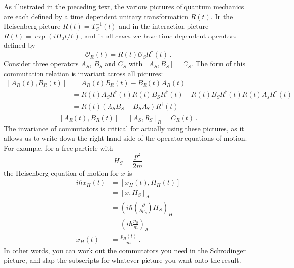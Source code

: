 
As illustrated in the preceding text, the various pictures of quantum mechanics are each defined by a time dependent unitary transformation $R(t)$.
In the Heisenberg picture $R(t) = T_S^{-1}(t)$ and in the interaction picture $R(t) = \exp(i H_0 t/ \hbar)$, and in all cases we have time dependent operators defined by
\begin{equation*}
  \mathcal{O}_R(t) = R(t) \mathcal{O}_S R^\dagger(t)
  \, .
\end{equation*}
Consider three operators $A_S$, $B_S$ and $C_S$ with $[A_S, B_S] = C_S$.
The form of this commutation relation is invariant across all pictures:
\begin{align*}
  \left[ A_R(t), B_R(t) \right]
  &= A_R(t) B_R(t) - B_R(t) A_R(t) \\
  &= R(t) A_S R^\dagger(t) R(t) B_S R^\dagger(t) - R(t) B_S R^\dagger(t) R(t) A_s R^\dagger(t) \\
  &= R(t) \left( A_S B_S - B_S A_S \right) R^\dagger(t) \\
\end{align*}
\begin{equation}
  \boxed{
  \left[ A_R(t), B_R(t) \right] = \left[ A_S, B_S \right]_R = C_R(t)
  }
  \, .
\end{equation}
The invariance of commutators is critical for actually using these pictures, as it allows us to write down the right hand side of the operator equations of motion.
For example, for a free particle with
\begin{equation*}
  H_S = \frac{p^2}{2m}
\end{equation*}
the Heisenberg equation of motion for $x$ is
\begin{align*}
  i \hbar \dot{x}_H(t)
  &= \left[ x_H(t), H_H(t) \right] \\
  &= \left[ x, H_S \right]_H \\
  &= \left( i \hbar \left(\frac{\partial}{\partial p_S} \right) H_S \right)_H \\
  &= \left( i \hbar \frac{p_S}{m} \right)_H \\
  \dot{x}_H(t) &= \frac{p_H(t)}{m}
  \, .
\end{align*}
In other words, you can work out the commutators you need in the Schrodinger picture, and slap the subscripts for whatever picture you want onto the result.
